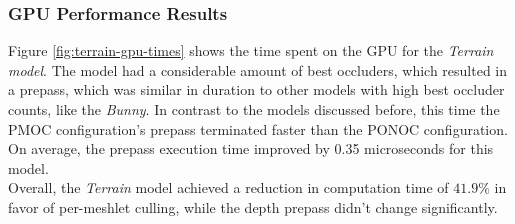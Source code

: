 \subsubsection*{GPU Performance Results} \label{subsubsec-gpu-performance-results-terrain}

Figure \ref{fig:terrain-gpu-times} shows the time spent on the \ac{GPU} for the \emph{Terrain model}.
The model had a considerable amount of best occluders, which resulted in a prepass, which was similar 
in duration to other models with high best occluder counts, like the \emph{Bunny}. In contrast to 
the models discussed before, this time the \ac{PMOC} configuration's prepass terminated faster 
than the \ac{PONOC} configuration. On average, the prepass execution time improved by 0.35 
microseconds for this model. \\

\noindent
Overall, the \emph{Terrain} model achieved a reduction in computation time of $41.9\%$ in favor of per-meshlet 
culling, while the depth prepass didn't change significantly.


